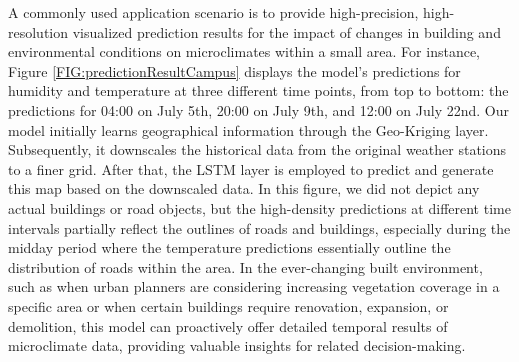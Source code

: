 \documentclass[a4paper,fleqn]{cas-sc}
\begin{document}
A commonly used application scenario is to provide high-precision, high-resolution visualized prediction results for the impact of changes in building and environmental conditions on microclimates within a small area. For instance, Figure \ref{FIG:predictionResultCampus} displays the model's predictions for humidity and temperature at three different time points, from top to bottom: the predictions for 04:00 on July 5th, 20:00 on July 9th, and 12:00 on July 22nd. Our model initially learns geographical information through the Geo-Kriging layer. Subsequently, it downscales the historical data from the original weather stations to a finer grid. After that, the LSTM layer is employed to predict and generate this map based on the downscaled data. In this figure, we did not depict any actual buildings or road objects, but the high-density predictions at different time intervals partially reflect the outlines of roads and buildings, especially during the midday period where the temperature predictions essentially outline the distribution of roads within the area. In the ever-changing built environment, such as when urban planners are considering increasing vegetation coverage in a specific area or when certain buildings require renovation, expansion, or demolition, this model can proactively offer detailed temporal results of microclimate data, providing valuable insights for related decision-making.
\end{document}
